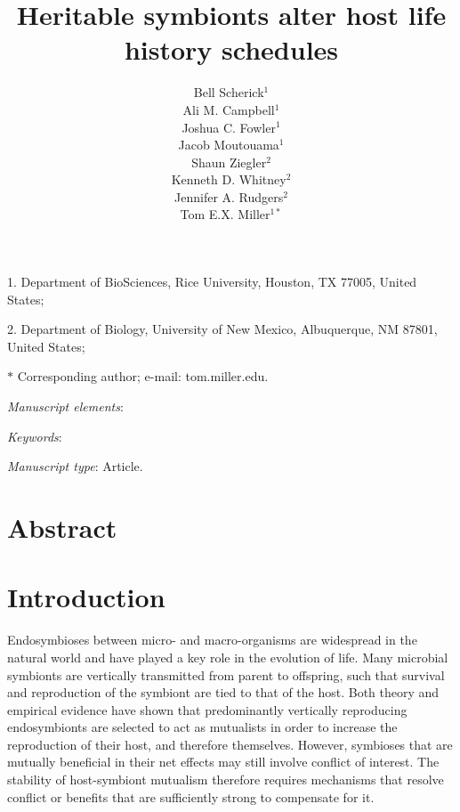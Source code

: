 \documentclass[11pt]{article}
\title{Heritable symbionts alter host life history schedules}
\author{Bell Scherick$^{1}$ \\ 
Ali M. Campbell$^{1}$ \\ 
Joshua C. Fowler$^{1}$ \\ 
Jacob Moutouama$^{1}$ \\ 
Shaun Ziegler$^{2}$ \\
Kenneth D. Whitney$^{2}$ \\
Jennifer A. Rudgers$^{2}$ \\
Tom E.X. Miller$^{1\ast}$}
\date{}
\begin{document}
\maketitle

\noindent{} 1. Department of BioSciences, Rice University, Houston, TX 77005, United States;

\noindent{} 2. Department of Biology, University of New Mexico, Albuquerque, NM 87801, United States;

\noindent{} $\ast$ Corresponding author; e-mail: tom.miller.edu.

\bigskip

\textit{Manuscript elements}: 

\bigskip

\textit{Keywords}: 

\bigskip

\textit{Manuscript type}: Article. %

\bigskip


\linenumbers{}
\modulolinenumbers[3]

\newpage{}

\section*{Abstract}



\newpage{}

\section*{Introduction}
Endosymbioses between micro- and macro-organisms are widespread in the natural world and have played a key role in the evolution of life.
Many microbial symbionts are vertically transmitted from parent to offspring, such that survival and reproduction of the symbiont are tied to that of the host. 
Both theory and empirical evidence have shown that predominantly vertically reproducing endosymbionts are selected to act as mutualists in order to increase the reproduction of their host, and therefore themselves.
However, symbioses that are mutually beneficial in their net effects may still involve conflict of interest. 
The stability of host-symbiont mutualism therefore requires mechanisms that resolve conflict or benefits that are sufficiently strong to compensate for it. 
\end{document}
